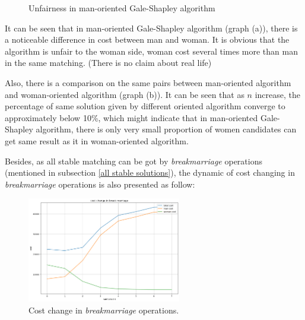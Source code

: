 \documentclass[14pt]{extarticle}
\begin{document}
\begin{figure}[H]
  \centering
  \quad
  \caption{Unfairness in man-oriented Gale-Shapley algorithm}
\end{figure}

It can be seen that in man-oriented Gale-Shapley algorithm (graph (a)), there is a noticeable difference in cost between man and woman.
It is obvious that the algorithm is unfair to the woman side, woman cost several times more than man in the same matching. (There is no claim about real life)

Also, there is a comparison on the same pairs between man-oriented algorithm and woman-oriented algorithm (graph (b)).
It can be seen that as $n$ increase, the percentage of same solution given by different oriented algorithm converge to approximately below 10\%,
which might indicate that in man-oriented Gale-Shapley algorithm, there is only very small proportion of women candidates can get same result as it in woman-oriented algorithm.

Besides, as all stable matching can be got by {\it breakmarriage} operations (mentioned in subsection \ref{all stable solutions}), 
the dynamic of cost changing in {\it breakmarriage} operations is also presented as follow:

\begin{figure}[H]
  \centering
  \includegraphics[width=0.6\textwidth]{cost change in breakmarriage.png}
  \caption{Cost change in {\it breakmarriage} operations.}
\end{figure} 
\end{document}
